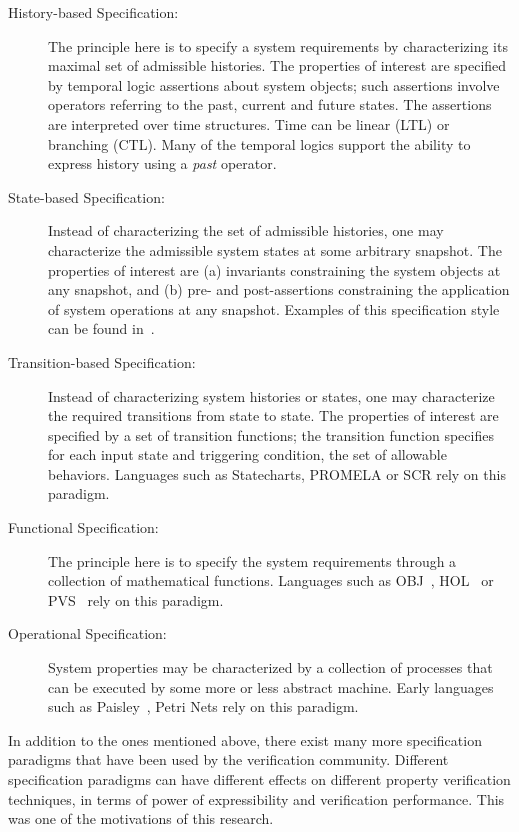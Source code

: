\begin{description}

\item [History-based Specification:] The principle here is to specify 
	a system requirements by characterizing its maximal set of 
	admissible histories. The properties of interest are specified 
	by temporal logic assertions about system objects; such assertions 
	involve operators referring to the past, current and future states. 
	The assertions are interpreted over time structures. Time can 
	be linear (LTL) or branching (CTL). Many of the temporal logics 
	support the ability to express history using a {\em past} 
	operator.

\item [State-based Specification:] Instead of characterizing the set 
	of admissible histories, one may characterize the admissible system 
	states at some arbitrary snapshot. The properties of interest are 
	(a) invariants constraining the system objects at any snapshot, and 
	(b) pre- and post-assertions constraining the application of 
	system operations at any snapshot. Examples of this specification 
	style can be found in~\cite{Abr80, Abr96}.

\item [Transition-based Specification:] Instead of characterizing 
	system histories or states, one may characterize the required 
	transitions from state to state. The properties of interest are 
	specified by a set of transition functions; the transition 
	function specifies for each input state and triggering condition, 
	the set of allowable behaviors. Languages such as Statecharts, 
	PROMELA or SCR rely on this paradigm.

\item [Functional Specification:] The principle here is to specify the 
	system requirements through a collection of mathematical functions. 
	Languages such as OBJ~\cite{fut95}, HOL~\cite{gor93} or 
	PVS~\cite{cro95} rely on this paradigm.

\item [Operational Specification:] System properties may be characterized by 
	a collection of processes that can be executed by some more or 
	less abstract machine. Early languages such as Paisley~\cite{zav82}, 
	Petri Nets rely on this paradigm.

\end{description}

\noindent
In addition to the ones mentioned above, there exist many more 
specification paradigms that have been used by the verification 
community. Different specification paradigms can have different effects on 
different property verification techniques, in terms of power of 
expressibility and verification performance. This was one of the motivations 
of this research.

